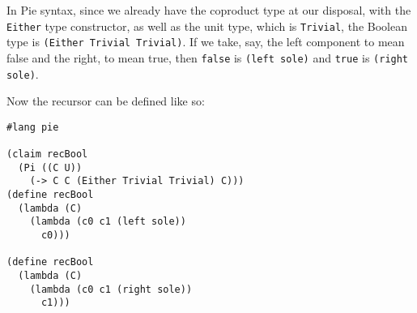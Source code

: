 \vspace{0.3cm}

In Pie syntax, since we already have the coproduct type at our disposal,
with the \texttt{Either} type constructor, as well as the unit type,
which is \texttt{Trivial}, the Boolean type is \texttt{(Either Trivial Trivial)}.
If we take, say, the left component to mean false and the right, to mean true, then
\texttt{false} is \texttt{(left sole)} and \texttt{true} is \texttt{(right sole)}.

Now the recursor can be defined like so:
{
  \small
\begin{verbatim}
#lang pie

(claim recBool
  (Pi ((C U)) 
    (-> C C (Either Trivial Trivial) C)))
(define recBool
  (lambda (C)
    (lambda (c0 c1 (left sole))
      c0)))

(define recBool
  (lambda (C)
    (lambda (c0 c1 (right sole))
      c1)))
\end{verbatim}
}





